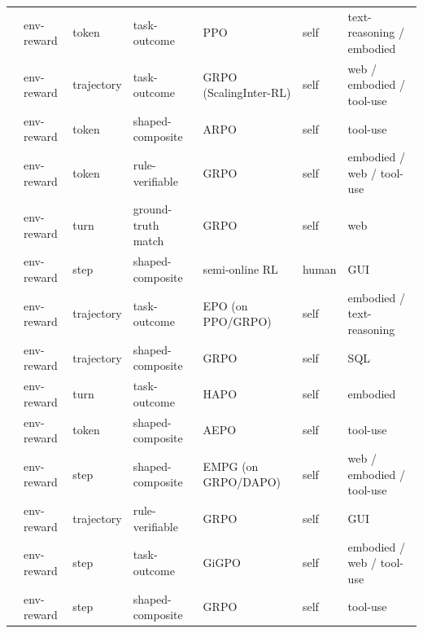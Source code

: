 \begin{table}[htbp]
{\begin{tabular}{@{}lllllll@{}}
\cite{Zha24s}  & env-reward & token      & task-outcome       & PPO                                 & self          & text-reasoning / embodied             \\
\cite{Xi25c}   & env-reward & trajectory & task-outcome       & GRPO (ScalingInter-RL)              & self          & web / embodied / tool-use             \\
\cite{Don25d}  & env-reward & token      & shaped-composite   & ARPO                                & self          & tool-use                              \\
\cite{Zha25ag} & env-reward & token      & rule-verifiable    & GRPO                                & self          & embodied / web / tool-use             \\
\cite{Wan25y}  & env-reward & turn       & ground-truth match & GRPO                                & self          & web                                   \\
\cite{Lu25j}   & env-reward & step       & shaped-composite   & semi-online RL                      & human         & GUI                                   \\
\cite{Xu25k}   & env-reward & trajectory & task-outcome       & EPO (on PPO/GRPO)                   & self          & embodied / text-reasoning             \\
\cite{Hua26d}  & env-reward & trajectory & shaped-composite   & GRPO                                & self          & SQL                                   \\
\cite{Hu26e}   & env-reward & turn       & task-outcome       & HAPO                                & self          & embodied                              \\
\cite{Don25c}  & env-reward & token      & shaped-composite   & AEPO                                & self          & tool-use                              \\
\cite{Wan25ad} & env-reward & step       & shaped-composite   & EMPG (on GRPO/DAPO)                 & self          & web / embodied / tool-use             \\
\cite{Lu25f}   & env-reward & trajectory & rule-verifiable    & GRPO                                & self          & GUI                                   \\
\cite{Fen25c}  & env-reward & step       & task-outcome       & GiGPO                               & self          & embodied / web / tool-use             \\
\cite{Qia25b}  & env-reward & step       & shaped-composite   & GRPO                                & self          & tool-use                              \\

\end{tabular}}
\end{table}
